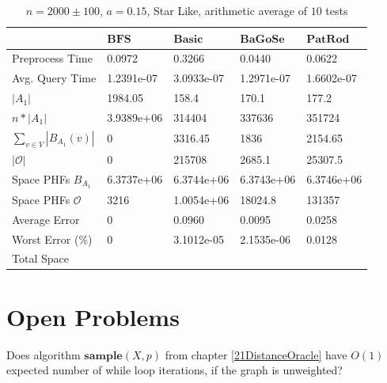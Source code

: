 \documentclass[shortabstract, lic, english]{iithesis}
\theoremstyle{definition} \newtheorem{definition}{Definition}[chapter]
\theoremstyle{remark} \newtheorem{remark}[definition]{Observation}
\theoremstyle{plain} \newtheorem{theorem}[definition]{Theorem}
\theoremstyle{plain} \newtheorem{lemma}[definition]{Lemma}
\theoremstyle{plain} \newtheorem{conjecture}[definition]{Conjecture}
\begin{document}
\begin{table}[H]
    \centering
    \begin{tabular}{ |p{3cm}||p{2cm}|p{2cm}|p{2cm}|p{2cm}|  } 
        \hline
        & $\mathbf{BFS}$ & $\mathbf{Basic}$ & $\mathbf{BaGoSe}$ & $\mathbf{PatRod}$ \\
        \hline
        \hline
        Preprocess Time                 & 0.0972     & 0.3266     & 0.0440      & 0.0622     \\
        \hline
        Avg. Query Time                 & 1.2391e-07 & 3.0933e-07 & 1.2971e-07  & 1.6602e-07 \\
        \hline
        $|A_1|$                         & 1984.05    & 158.4      & 170.1       & 177.2      \\
        \hline
        $n * |A_1|$                     & 3.9389e+06 & 314404     & 337636      & 351724     \\
        \hline
        $\sum_{v \in V} |B_{A_1}(v)| $  & 0          & 3316.45    & 1836        & 2154.65    \\
        \hline
        $|\mathcal{O}|$                 & 0          & 215708     & 2685.1      & 25307.5    \\
        \hline
        Space PHFs $B_{A_1}$            & 6.3737e+06 & 6.3744e+06 & 6.3743e+06  & 6.3746e+06 \\
        \hline
        Space PHFs $\mathcal{O}$        & 3216       & 1.0054e+06 & 18024.8     & 131357     \\
        \hline
        Average Error                   & 0          & 0.0960     & 0.0095      & 0.0258     \\
        \hline
        Worst Error (\%)                & 0          & 3.1012e-05 & 2.1535e-06  & 0.0128     \\
        \hline
        Total Space                     &            &            &             &            \\
        \hline

    \end{tabular}
    \caption{$n = 2000 \pm 100$, $a = 0.15$, Star Like, arithmetic average of $10$ tests}
\end{table}

\section{Open Problems}

    Does algorithm $\mathbf{sample}(X, p)$ from chapter \ref{21DistanceOracle} have $O(1)$ expected number of while loop iterations,
    if the graph is unweighted?
\end{document}
